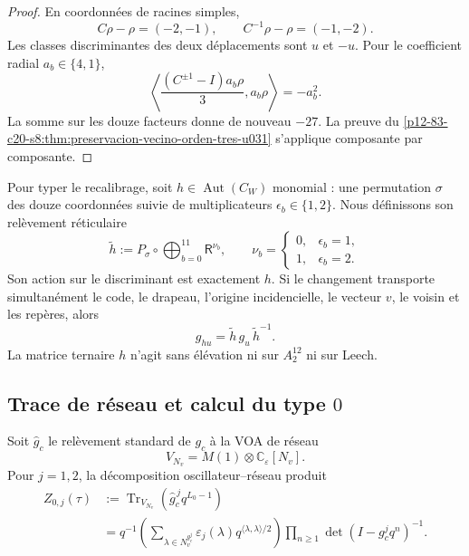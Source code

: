 \begin{proof}
En coordonnées de racines simples,
\[
 C\rho-\rho=(-2,-1),
 \qquad
 C^{-1}\rho-\rho=(-1,-2).
\]
Les classes discriminantes des deux déplacements sont \(u\) et \(-u\).
Pour le coefficient radial \(a_b\in\{4,1\}\),
\[
 \left\langle
 \frac{(C^{\pm1}-I)a_b\rho}{3},a_b\rho
 \right\rangle=-a_b^2.
\]
La somme sur les douze facteurs donne de nouveau \(-27\). La preuve du
\cref{p12-83-c20-s8:thm:preservacion-vecino-orden-tres-u031} s’applique composante par
composante.
\end{proof}

Pour typer le recalibrage, soit
\(h\in\operatorname{Aut}(C_W)\) monomial : une permutation \(\sigma\) des
douze coordonnées suivie de multiplicateurs
\(\epsilon_b\in\{1,2\}\). Nous définissons son relèvement réticulaire
\begin{equation}
 \widetilde h
 :=P_\sigma\circ
 \bigoplus_{b=0}^{11}\mathsf R^{\nu_b},
 \qquad
 \nu_b=
 \begin{cases}
 0,&\epsilon_b=1,\\
 1,&\epsilon_b=2.
 \end{cases}
 \label{p12-83-c20-s8:eq:elevacion-monomial-u031}
\end{equation}
Son action sur le discriminant est exactement \(h\). Si le changement transporte
simultanément le code, le drapeau, l’origine incidencielle, le vecteur \(v\), le voisin et les
repères, alors
\begin{equation}
 g_{hu}=\widetilde h\,g_u\,\widetilde h^{-1}.
 \label{p12-83-c20-s8:eq:naturalidad-isometrias-u031}
\end{equation}
La matrice ternaire \(h\) n’agit sans élévation ni sur \(A_2^{12}\) ni sur
Leech.

\subsection{Trace de réseau et calcul du type \(0\)}

Soit \(\widehat g_c\) le relèvement standard de \(g_c\) à la VOA de réseau
\[
 V_{N_v}=M(1)\otimes\mathbb C_\varepsilon[N_v].
\]
Pour \(j=1,2\), la décomposition oscillateur--réseau produit
\begin{equation}
 \begin{split}
 Z_{0,j}(\tau)
 &:=
 \operatorname{Tr}_{V_{N_v}}
 \left(\widehat g_c^{\,j}q^{L_0-1}\right)\\
 &=q^{-1}
 \left(
 \sum_{\lambda\in N_v^{g_c^j}}
 \varepsilon_j(\lambda)
 q^{\langle\lambda,\lambda\rangle/2}
 \right)
 \prod_{n\ge1}\det(I-g_c^jq^n)^{-1}.
 \end{split}
 \label{p12-83-c20-s8:eq:factorizacion-traza-reticular-u031}
\end{equation}

